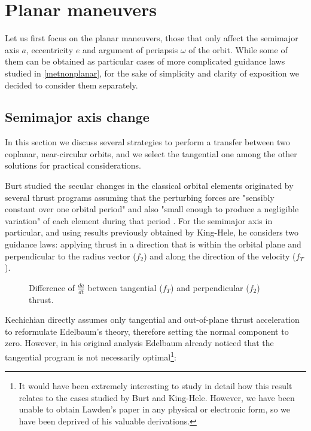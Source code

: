 \section{Planar maneuvers} \label{metplanar}

Let us first focus on the planar maneuvers, those that only affect the semimajor axis $a$, eccentricity $e$ and argument of periapsis $\omega$ of the orbit. While some of them can be obtained as particular cases of more complicated guidance laws studied in \ref{metnonplanar}, for the sake of simplicity and clarity of exposition we decided to consider them separately.

\subsection{Semimajor axis change} \label{metsma}

In this section we discuss several strategies to perform a transfer between two coplanar, near-circular orbits, and we select the tangential one among the other solutions for practical considerations.

Burt studied the secular changes in the classical orbital elements originated by several thrust programs assuming that the perturbing forces are "sensibly constant over one orbital period" and also "small enough to produce a negligible variation" of each element during that period \cite{burt1967space}. For the semimajor axis in particular, and using results previously obtained by King-Hele, he considers two guidance laws: applying thrust in a direction that is within the orbital plane and perpendicular to the radius vector ($f_2$)  and along the direction of the velocity ($f_T$).

\begin{figure}%
  \centering
  \resizebox{1.0\textwidth}{!}
  {
  
  }
  \caption{Difference of $\frac{da}{dt}$ between tangential ($f_T$) and perpendicular ($f_2$) thrust.}
  \label{fig:burtdiff}
\end{figure}

Kechichian directly assumes only tangential and out-of-plane thrust acceleration to reformulate Edelbaum's theory, therefore setting the normal component to zero. However, in his original analysis Edelbaum already noticed that the tangential program is not necessarily optimal\footnote{It would have been extremely interesting to study in detail how this result relates to the cases studied by Burt and King-Hele. However, we have been unable to obtain Lawden's paper in any physical or electronic form, so we have been deprived of his valuable derivations.}:

